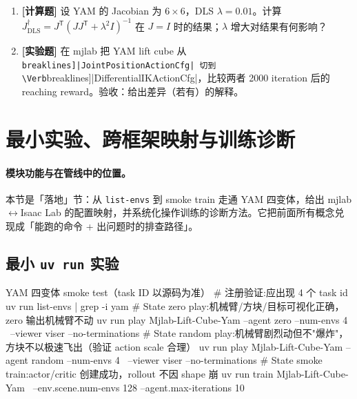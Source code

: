 \begin{practice}[本节练习]
\begin{enumerate}
  \item \textbf{[计算题]} 设 YAM 的 Jacobian 为 $6\times6$，DLS $\lambda=0.01$。计算 $J^\dagger_{\text{DLS}}=J^{\mathsf T}(JJ^{\mathsf T}+\lambda^2 I)^{-1}$ 在 $J=I$ 时的结果；$\lambda$ 增大对结果有何影响？
  \item \textbf{[实验题]} 在 mjlab 把 YAM lift cube 从 \Verb[breaklines]|JointPositionActionCfg| 切到 \Verb[breaklines]|DifferentialIKActionCfg|，比较两者 2000 iteration 后的 reaching reward。验收：给出差异（若有）的解释。
\end{enumerate}
\end{practice}

\section{最小实验、跨框架映射与训练诊断}
\label{sec:rlmc-manip-run}

\paragraph{模块功能与在管线中的位置。}本节是「落地」节：从 \verb|list-envs| 到 smoke train 走通 YAM 四变体，给出 mjlab$\leftrightarrow$Isaac Lab 的配置映射，并系统化操作训练的诊断方法。它把前面所有概念兑现成「能跑的命令 + 出问题时的排查路径」。

\subsection{最小 \texttt{uv run} 实验}
\label{sec:rlmc-manip-smoke}

\begin{codebox}[bash]{YAM 四变体 smoke test（task ID 以源码为准）}
# 注册验证:应出现 4 个 task id
uv run list-envs | grep -i yam
# State zero play:机械臂/方块/目标可视化正确，zero 输出机械臂不动
uv run play Mjlab-Lift-Cube-Yam --agent zero --num-envs 4 \
    --viewer viser --no-terminations
# State random play:机械臂剧烈动但不"爆炸"，方块不以极速飞出（验证 action scale 合理）
uv run play Mjlab-Lift-Cube-Yam --agent random --num-envs 4 \
    --viewer viser --no-terminations
# State smoke train:actor/critic 创建成功，rollout 不因 shape 崩
uv run train Mjlab-Lift-Cube-Yam \
    --env.scene.num-envs 128 --agent.max-iterations 10
\end{codebox}

